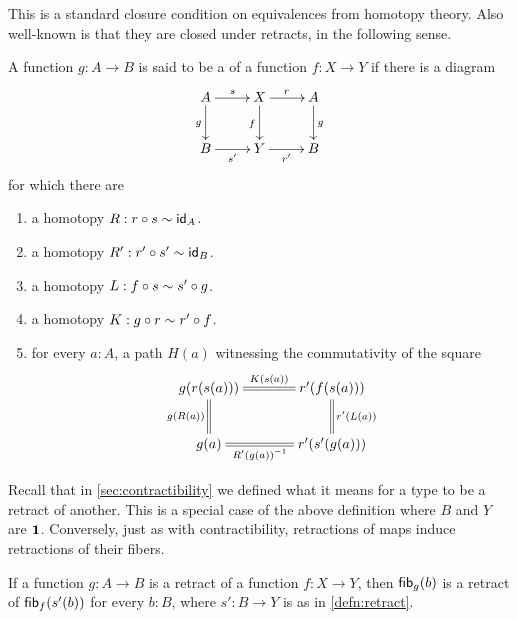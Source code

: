 This is a standard closure condition on equivalences from homotopy theory.
Also well-known is that they are closed under retracts, in the following sense.

%

\begin{defn}\label{defn:retract}
A function $g:A\to B$ is said to be a 
of a function $f:X\to Y$ if there is a diagram
\begin{equation*}
  \xymatrix{
    {A} \ar[r]^{s} \ar[d]_{g}
    &
    {X} \ar[r]^{r} \ar[d]_{f}
    &
    {A} \ar[d]^{g}
    \\
    {B} \ar[r]_{s'}
    &
    {Y} \ar[r]_{r'}
    &
    {B}
  }
\end{equation*}
for which there are
\begin{enumerate}
\item a homotopy $R:r\circ s \htpy \idfunc[A]$.
\item a homotopy $R':r'\circ s' \htpy\idfunc[B]$.
\item a homotopy $L:f\circ s\htpy s'\circ g$.
\item a homotopy $K:g\circ r\htpy r'\circ f$.
\item for every $a:A$, a path $H(a)$ witnessing the commutativity of the square
\begin{equation*}
  \xymatrix@C=3pc{
    {g(r(s(a)))} \ar@{=}[r]^-{K(s(a))} \ar@{=}[d]_{\ap g{R(a)}}
    &
    {r'(f(s(a)))} \ar@{=}[d]^{\ap{r'}{L(a)}}
    \\
    {g(a)} \ar@{=}[r]_-{\opp{R'(g(a))}}
    &
    {r'(s'(g(a)))}
  }
\end{equation*}
\end{enumerate}
\end{defn}

Recall that in \cref{sec:contractibility} we defined what it means for a type to be a retract of another.
This is a special case of the above definition where $B$ and $Y$ are $\unit$.
Conversely, just as with contractibility, retractions of maps induce retractions of their fibers.

\begin{lem}\label{lem:func_retract_to_fiber_retract}
If a function $g:A\to B$ is a retract of a function $f:X\to Y$, then $\hfib{g}b$ is a retract of $\hfib{f}{s'(b)}$
for every $b:B$, where $s':B\to Y$ is as in \cref{defn:retract}.
\end{lem}

